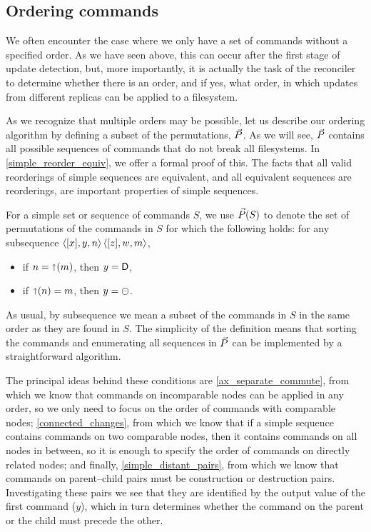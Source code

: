 
\subsection{Ordering commands}

We often encounter the case where we only have a set of commands without a specified order.
As we have seen above, this can occur after the first stage of update detection,
but, more importantly,
it is actually the task of the reconciler to determine whether there is an order,
and if yes, what order,
in which updates from different replicas can be applied to a filesystem.

As we recognize that multiple orders may be possible,
let us describe our ordering algorithm by
defining a subset of the permutations, $\ordersetsign$.
As we will see, $\ordersetsign$ contains all possible
sequences of commands that do not break all filesystems.
In \cref{simple_reorder_equiv}, we offer a formal proof of this.
The facts that all valid reorderings of simple sequences are equivalent,
and all equivalent sequences are reorderings, are important 
properties of simple sequences.


\begin{mydef}[$\ordersetsign$]
For a simple set or sequence of commands $S$,
we use $\vec{P}({S})$ to denote the set of 
permutations of the commands in $S$
for which the following holds:
for any subsequence $\langle{[x],y,n}\rangle\,\langle{[z],w,m}\rangle$,
\begin{itemize}
\item if $n=\mathord{\shortuparrow}({m})$, then $y=\mathsf{D}$,
\item if $\mathord{\shortuparrow}({n})=m$, then $y=\ominus$.
\end{itemize}
\end{mydef}

As usual, by subsequence we mean a subset of the commands in $S$ in the same order as they are found in $S$.
The simplicity of the definition means that sorting the commands
and enumerating
all sequences in $\ordersetsign$ can be implemented by a straightforward
algorithm.

The principal ideas behind these conditions are 
\cref{ax_separate_commute}, from which we know that commands on incomparable
nodes can be applied in any order, so we only need to focus on the order of commands
with comparable nodes;
\cref{connected_changes}, from which we know that if a simple sequence contains commands on two comparable
nodes, then it contains commands on all nodes in between, so it is enough to specify
the order of commands on directly related nodes;
and finally, \cref{simple_distant_pairs}, from which we know
that commands on parent--child pairs must be construction or destruction pairs.
Investigating these pairs we see that they are identified by the output value of the first command ($y$),
which in turn determines whether the command on the parent or the child must precede the other.

